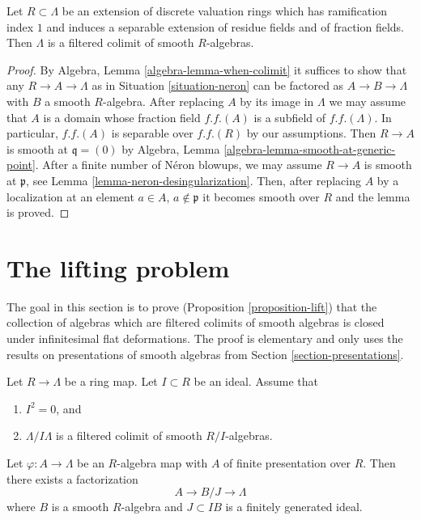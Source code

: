 \begin{lemma}
\label{lemma-neron-colimit}
Let $R \subset \Lambda$ be an extension of discrete valuation
rings which has ramification index $1$ and induces a separable
extension of residue fields and of fraction fields.
Then $\Lambda$ is a filtered colimit of smooth $R$-algebras.
\end{lemma}

\begin{proof}
By Algebra, Lemma \ref{algebra-lemma-when-colimit} it suffices to show
that any $R \to A \to \Lambda$ as in Situation \ref{situation-neron}
can be factored as $A \to B \to \Lambda$ with $B$ a
smooth $R$-algebra. After replacing $A$ by its image in $\Lambda$
we may assume that $A$ is a domain whose fraction field
$f.f.(A)$ is a subfield of $f.f.(\Lambda)$.
In particular, $f.f.(A)$ is separable over $f.f.(R)$ by our assumptions.
Then $R \to A$ is smooth at $\mathfrak q = (0)$ by
Algebra, Lemma \ref{algebra-lemma-smooth-at-generic-point}.
After a finite number of N\'eron blowups, we may assume $R \to A$
is smooth at $\mathfrak p$, see Lemma \ref{lemma-neron-desingularization}.
Then, after replacing $A$ by a localization
at an element $a \in A$, $a \not \in \mathfrak p$ it becomes
smooth over $R$ and the lemma is proved.
\end{proof}












\section{The lifting problem}
\label{section-lifting}

\noindent
The goal in this section is to prove (Proposition \ref{proposition-lift})
that the collection of algebras which are filtered colimits of smooth algebras
is closed under infinitesimal flat deformations. The proof is elementary
and only uses the results on presentations of smooth algebras from
Section \ref{section-presentations}.

\begin{lemma}
\label{lemma-lift-once}
Let $R \to \Lambda$ be a ring map. Let $I \subset R$ be an ideal.
Assume that
\begin{enumerate}
\item $I^2 = 0$, and
\item $\Lambda/I\Lambda$ is a filtered colimit of smooth $R/I$-algebras.
\end{enumerate}
Let $\varphi : A \to \Lambda$ be an $R$-algebra map with $A$ of finite
presentation over $R$. Then there exists a factorization
$$
A \to B/J \to \Lambda
$$
where $B$ is a smooth $R$-algebra and $J \subset IB$ is a finitely generated
ideal.
\end{lemma}

